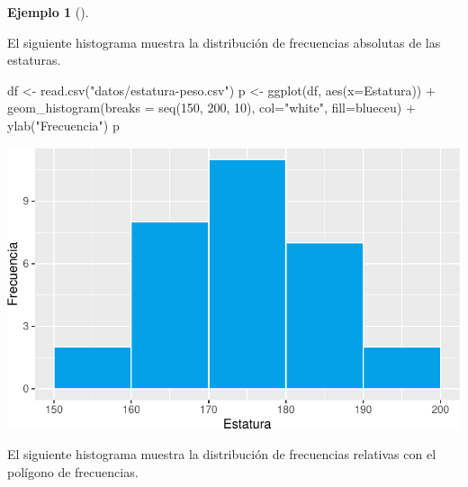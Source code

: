 \documentclass[
  a4paper,
]{scrreport}
\newenvironment{Shaded}{\begin{snugshade}}{\end{snugshade}}
\newcommand{\AttributeTok}[1]{\textcolor[rgb]{0.40,0.45,0.13}{#1}}
\newcommand{\DecValTok}[1]{\textcolor[rgb]{0.68,0.00,0.00}{#1}}
\newcommand{\FunctionTok}[1]{\textcolor[rgb]{0.28,0.35,0.67}{#1}}
\newcommand{\NormalTok}[1]{\textcolor[rgb]{0.00,0.23,0.31}{#1}}
\newcommand{\OtherTok}[1]{\textcolor[rgb]{0.00,0.23,0.31}{#1}}
\newcommand{\SpecialCharTok}[1]{\textcolor[rgb]{0.37,0.37,0.37}{#1}}
\newcommand{\StringTok}[1]{\textcolor[rgb]{0.13,0.47,0.30}{#1}}
\theoremstyle{plain}
\theoremstyle{definition}
\newtheorem{example}{Ejemplo}[chapter]
\theoremstyle{definition}
\theoremstyle{remark}
\begin{document}
\begin{example}[]\protect\hypertarget{exm-histograma}{}\label{exm-histograma}

El siguiente histograma muestra la distribución de frecuencias absolutas
de las estaturas.

\begin{Shaded}
\begin{Highlighting}[]
\NormalTok{df }\OtherTok{\textless{}{-}} \FunctionTok{read.csv}\NormalTok{(}\StringTok{"datos/estatura{-}peso.csv"}\NormalTok{)}
\NormalTok{p }\OtherTok{\textless{}{-}} \FunctionTok{ggplot}\NormalTok{(df, }\FunctionTok{aes}\NormalTok{(}\AttributeTok{x=}\NormalTok{Estatura)) }\SpecialCharTok{+} 
    \FunctionTok{geom\_histogram}\NormalTok{(}\AttributeTok{breaks =} \FunctionTok{seq}\NormalTok{(}\DecValTok{150}\NormalTok{, }\DecValTok{200}\NormalTok{, }\DecValTok{10}\NormalTok{), }\AttributeTok{col=}\StringTok{"white"}\NormalTok{, }\AttributeTok{fill=}\NormalTok{blueceu) }\SpecialCharTok{+}
    \FunctionTok{ylab}\NormalTok{(}\StringTok{"Frecuencia"}\NormalTok{)}
\NormalTok{p}
\end{Highlighting}
\end{Shaded}

\includegraphics{02-estadistica-descriptiva_files/figure-pdf/histograma-1.pdf}

El siguiente histograma muestra la distribución de frecuencias relativas
con el polígono de frecuencias.


\end{example}
\end{document}
